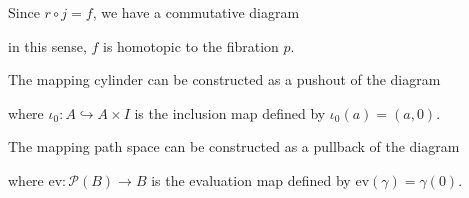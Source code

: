     Since $r\circ j = f$, we have a commutative diagram
    \begin{center}
    \end{center}
    in this sense, $f$ is homotopic to the fibration $p$. 

    \begin{remark}
        The mapping cylinder can be constructed as a pushout of the diagram
        \begin{center}
        \end{center}
        where $\iota_0: A\hookrightarrow A\times I$ is the inclusion map
        defined by $\iota_0(a) = (a,0)$.

        The mapping path space can be constructed as a pullback of 
        the diagram
        \begin{center}
        \end{center}
        where $\mathrm{ev}: \mathcal{P}(B) \to B$ 
        is the evaluation map defined by 
        $\mathrm{{ev}}(\gamma) = \gamma(0)$.
    \end{remark}

